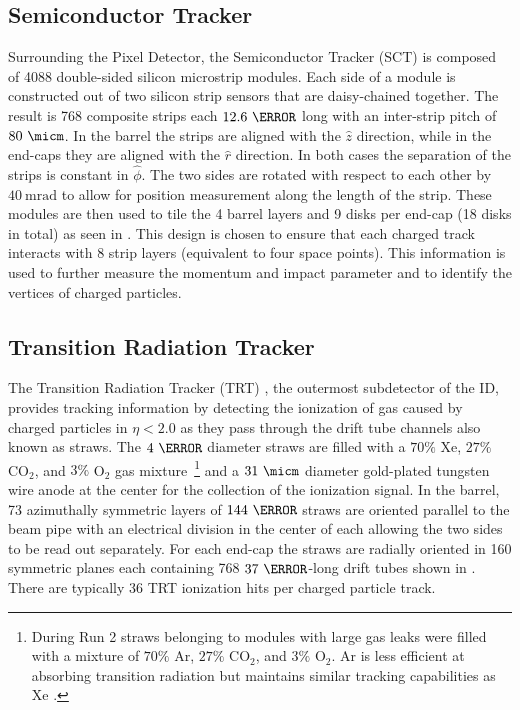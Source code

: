 \subsection{Semiconductor Tracker}

Surrounding the Pixel Detector, the Semiconductor Tracker (SCT)
\cite{PERF-2007-01} is composed of 4088 double-sided silicon microstrip modules.
Each side of a module is constructed out of two silicon strip sensors
that are daisy-chained together.  The result is 768 composite strips each
$12.6~\cm$ long with an inter-strip pitch of $80~\micm$. In the barrel the
strips are aligned with the $\hat{z}$ direction, while in the end-caps they are
aligned with the $\hat{r}$ direction. In both cases the separation of the
strips is constant in $\hat{\phi}$. The two sides are rotated with respect to
each other by $40~\text{mrad}$ to allow for position measurement along the
length of the strip.  These modules are then used to tile the 4 barrel layers
and 9 disks per end-cap (18 disks in total) as seen in
.  This design is chosen to ensure that each
charged track interacts with 8 strip layers (equivalent to four space points).
This information is used to further measure the momentum and impact parameter
and to identify the vertices of charged particles.

\subsection{Transition Radiation Tracker}

The Transition Radiation Tracker (TRT) \cite{PERF-2007-01}, the outermost
subdetector of the ID, provides tracking information by detecting the
ionization of gas caused by charged particles in $\eta < 2.0$ as they pass
through the drift tube channels also known as straws.  The $4~\mm$
diameter straws are filled with a $70\%$ Xe, $27\%$ CO$_2$, and $3\%$ O$_2$ gas
mixture~\footnote{During Run 2 straws belonging to modules with large gas leaks
were filled with a mixture of $70\%$ Ar, $27\%$ CO$_2$, and $3\%$ O$_2$.  Ar is
less efficient at absorbing transition radiation but maintains similar tracking
capabilities as Xe \cite{Aaboud:2017odu}.} and a $31~\micm$ diameter
gold-plated tungsten wire anode at the center for the collection of the
ionization signal.  In the barrel, 73 azimuthally symmetric layers of $144~\cm$
straws are oriented parallel to the beam pipe with an electrical division in
the center of each allowing the two sides to be read out separately.  For each
end-cap the straws are radially oriented in 160 symmetric planes each containing
768 $37~\cm$-long drift tubes shown in .
There are typically 36 TRT ionization hits per charged particle track. 

